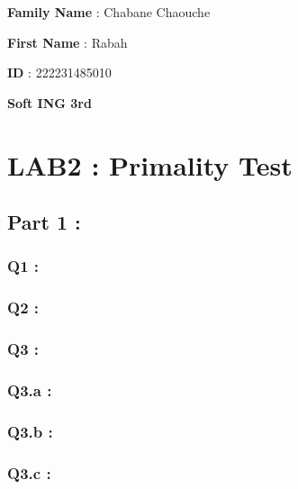 \documentclass[fleqn]{article}
\begin{document}
\renewcommand{\arrayrulewidth}{0.75mm} %
\setlength{\tabcolsep}{5.5pt} %
\renewcommand{\arraystretch}{1.5} %

\textbf{Family Name} : Chabane Chaouche

 \textbf{First Name} : Rabah

 \textbf{ID }: 222231485010

 \textbf{Soft ING 3rd}
 
 \vspace{1cm}


\section*{LAB2 : Primality Test}

\subsection*{Part 1 :}

\subsubsection*{Q1 :}


\subsubsection*{Q2 :}




\subsubsection*{Q3 :}


\newpage
\subsubsection*{Q3.a :}


\subsubsection*{Q3.b :}


\subsubsection*{Q3.c :}

\end{document}
